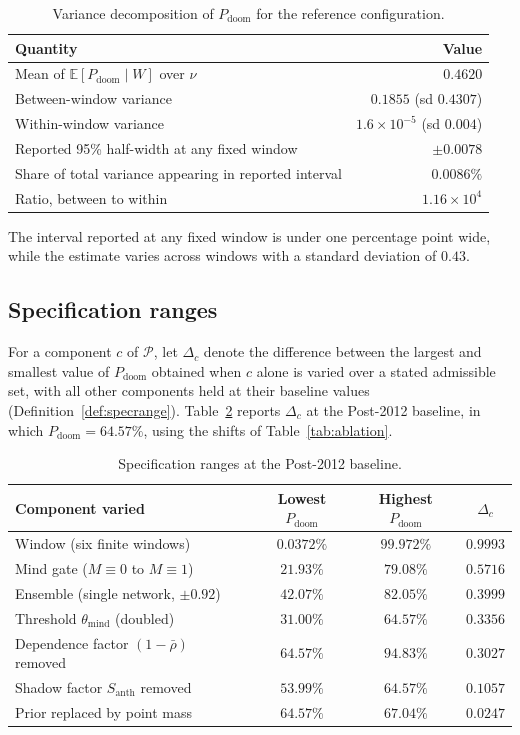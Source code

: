 \documentclass[11pt]{article}
\theoremstyle{remark}
\newcommand{\PD}{P_{\mathrm{doom}}}
\newcommand{\Santh}{S_{\mathrm{anth}}}
\newcommand{\rhobar}{\bar{\rho}}
\newcommand{\Ex}{\mathbb{E}}
\begin{document}
\begin{table}[h]
\centering
\caption{Variance decomposition of $\PD$ for the reference configuration.}\label{tab:vardec}
\begin{tabular}{@{}lr@{}}
\toprule
Quantity & Value \\
\midrule
Mean of $\Ex[\PD\mid W]$ over $\nu$ & $0.4620$ \\
Between-window variance & $0.1855$ (sd $0.4307$) \\
Within-window variance & $1.6\times10^{-5}$ (sd $0.004$) \\
Reported 95\% half-width at any fixed window & $\pm0.0078$ \\
Share of total variance appearing in reported interval & $0.0086\%$ \\
Ratio, between to within & $1.16\times10^{4}$ \\
\bottomrule
\end{tabular}
\end{table}

The interval reported at any fixed window is under one percentage point wide, while the estimate varies across windows with a standard deviation of $0.43$.

\subsection{Specification ranges}

For a component $c$ of $\mathcal{P}$, let $\Delta_c$ denote the difference between the largest and smallest value of $\PD$ obtained when $c$ alone is varied over a stated admissible set, with all other components held at their baseline values (Definition~\ref{def:specrange}). Table~\ref{tab:specrange} reports $\Delta_c$ at the Post-2012 baseline, in which $\PD=64.57\%$, using the shifts of Table~\ref{tab:ablation}.

\begin{table}[h]
\centering
\caption{Specification ranges at the Post-2012 baseline.}\label{tab:specrange}
\begin{tabular}{@{}lccc@{}}
\toprule
Component varied & Lowest $\PD$ & Highest $\PD$ & $\Delta_c$ \\
\midrule
Window (six finite windows) & $0.0372\%$ & $99.972\%$ & $0.9993$ \\
Mind gate ($M\equiv0$ to $M\equiv1$) & $21.93\%$ & $79.08\%$ & $0.5716$ \\
Ensemble (single network, $\pm0.92$) & $42.07\%$ & $82.05\%$ & $0.3999$ \\
Threshold $\theta_{\mathrm{mind}}$ (doubled) & $31.00\%$ & $64.57\%$ & $0.3356$ \\
Dependence factor $(1-\rhobar)$ removed & $64.57\%$ & $94.83\%$ & $0.3027$ \\
Shadow factor $\Santh$ removed & $53.99\%$ & $64.57\%$ & $0.1057$ \\
Prior replaced by point mass & $64.57\%$ & $67.04\%$ & $0.0247$ \\
\bottomrule
\end{tabular}
\end{table}
\end{document}
